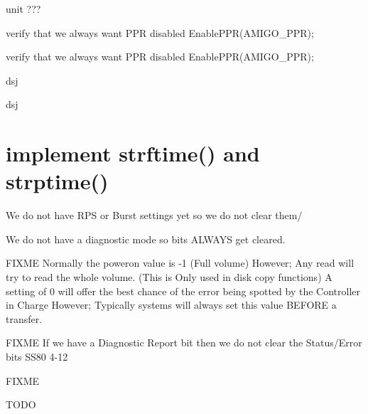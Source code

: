 \begin{DoxyRefList}
unit ???  
\item[\label{todo__todo000002}%
\hypertarget{todo__todo000002}{}%
Global \hyperlink{amigo_8h_ab63435382919a7106a374b021861a2e1}{amigo\+\_\+init} (void)]verify that we always want P\+PR disabled Enable\+P\+P\+R(\+A\+M\+I\+G\+O\+\_\+\+P\+P\+R);  
\item[\label{todo__todo000002}%
\hypertarget{todo__todo000002}{}%
Global \hyperlink{amigo_8h_ab63435382919a7106a374b021861a2e1}{amigo\+\_\+init} (void)]verify that we always want P\+PR disabled Enable\+P\+P\+R(\+A\+M\+I\+G\+O\+\_\+\+P\+P\+R);  
\item[\label{todo__todo000003}%
\hypertarget{todo__todo000003}{}%
Global \hyperlink{amigo_8h_afb2f0c0517c5c10c38f8e15b8b281a8c}{amigo\+\_\+request\+\_\+status} (void)]dsj  
\item[\label{todo__todo000003}%
\hypertarget{todo__todo000003}{}%
Global \hyperlink{amigo_8h_afb2f0c0517c5c10c38f8e15b8b281a8c}{amigo\+\_\+request\+\_\+status} (void)]dsj  
\item[\label{todo__todo000001}%
\hypertarget{todo__todo000001}{}%
Global \hyperlink{time_8h_a7ffc52def0c7fbf70c50248e3f7d6a8a}{asctime\+\_\+r} (tm\+\_\+t $\ast$t, char $\ast$buf)]\section*{implement strftime() and strptime() }


\item[\label{todo__todo000059}%
\hypertarget{todo__todo000059}{}%
Global \hyperlink{ss80_8h_aa48ccb1479e226dacfaa1dac15631a9d}{Clear\+\_\+\+Common} (int u)]We do not have R\+PS or Burst settings yet so we do not clear them/ 

We do not have a diagnostic mode so bits A\+L\+W\+A\+YS get cleared. 

F\+I\+X\+ME Normally the poweron value is -\/1 (Full volume) However; Any read will try to read the whole volume. (This is Only used in disk copy functions) A setting of 0 will offer the best chance of the error being spotted by the Controller in Charge However; Typically systems will always set this value B\+E\+F\+O\+RE a transfer. 

F\+I\+X\+ME If we have a Diagnostic Report bit then we do not clear the Status/\+Error bits S\+S80 4-\/12  
\item[\label{todo__todo000066}%
\hypertarget{todo__todo000066}{}%
Global \hyperlink{fatfs__utils_8h_a97a2409a53057e1a63537f196ff00a50}{fatfs\+\_\+cat} (char $\ast$name)]F\+I\+X\+ME  
\item[\label{todo__todo000018}%
\hypertarget{todo__todo000018}{}%
Global \hyperlink{gpib__task_8h_ac63d4e431ab55dddfbf436d87135128e}{G\+P\+IB} (uint8\+\_\+t ch)]T\+O\+DO 


\end{DoxyRefList}
